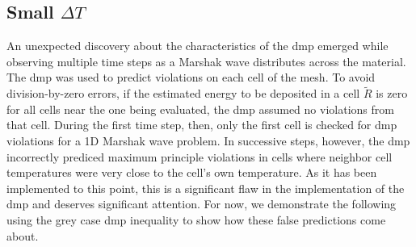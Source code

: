 \belowSubSecSkip


\aboveSubSecSkip

\subsection{Small $\Delta T$}
\label{sec:Results-dT}

\noindent
	\indent An unexpected discovery about the characteristics of the \gls{dmp} emerged while observing multiple time steps as a Marshak wave distributes across the material.  The \gls{dmp} was used to predict violations on each cell of the mesh.  To avoid division-by-zero errors, if the estimated energy to be deposited in a cell $\tilde R$ is zero for all cells near the one being evaluated, the \gls{dmp} assumed no violations from that cell.  During the first time step, then, only the first cell is checked for \gls{dmp} violations for a 1D Marshak wave problem.  In successive steps, however, the \gls{dmp} incorrectly prediced maximum principle violations in cells where neighbor cell temperatures were very close to the cell's own temperature.  As it has been implemented to this point, this is a significant flaw in the implementation of the \gls{dmp} and deserves significant attention.  For now, we demonstrate the following using the grey case \gls{dmp} inequality to show how these false predictions come about.  

